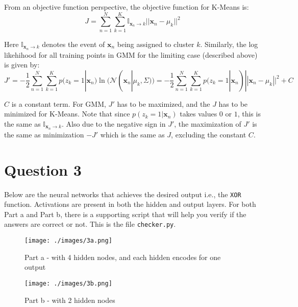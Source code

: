 \documentclass{article}
\newcommand{\xbold}{\mathbf{x}}
\newcommand{\ind}{\mathbb{I}}
\begin{document}
\begin{flushleft}
From an objective function perspective, the objective function for K-Means is:
\begin{equation}
J = \sum_{n=1}^{N} \sum_{k=1}^{K} \ind_{\xbold_{n} \rightarrow k} ||\xbold_{n} - \mu_{k}||^{2}
\end{equation}

Here \(\ind_{\xbold_{n} \rightarrow k}\) denotes the event of \(\xbold_{n}\) being assigned to cluster \(k\). Similarly, the log likehihood for all training points in GMM for the limiting case (described above) is given by:
\begin{equation}
J' = -\frac{1}{2}\sum_{n=1}^{N} \sum_{k=1}^{K} p(z_{k} = 1 | \xbold_{n}) \ln(\mathcal{N}(\xbold_{n}|\mu_{k}, \Sigma)) = -\frac{1}{2}\sum_{n=1}^{N} \sum_{k=1}^{K} p(z_{k} = 1 | \xbold_{n}) ||\xbold_{n} - \mu_{k}||^{2} + C
\end{equation}

\(C\) is a constant term. For GMM, \(J'\) has to be maximized, and the \(J\) has to be minimized for K-Means. Note that since \(p(z_{k} = 1 | \xbold_{n})\) takes values \(0\) or \(1\), this is the same as \(\ind_{\xbold_{n} \rightarrow k}\). Also due to the negative sign in \(J'\), the maximization of \(J'\) is the same as minimization \(-J'\) which is the same as \(J\), excluding the constant \(C\).
\end{flushleft}
\section*{Question 3}

Below are the neural networks that achieves the desired output i.e., the \texttt{XOR} function. Activations are present in both the hidden and output layers. For both Part a and Part b, there is a supporting script that will help you verify if the answers are correct or not. This is the file \texttt{checker.py}.

\begin{figure}[H]
\begin{minipage}{0.48\linewidth}
\centering
\texttt{[image: ./images/3a.png]}
\caption{Part a - with 4 hidden nodes, and each hidden encodes for one output}
\end{minipage}
\hfill
\begin{minipage}{0.48\linewidth}
\centering
\texttt{[image: ./images/3b.png]}
\caption{Part b - with 2 hidden nodes}
\end{minipage}
\end{figure}
\end{document}
